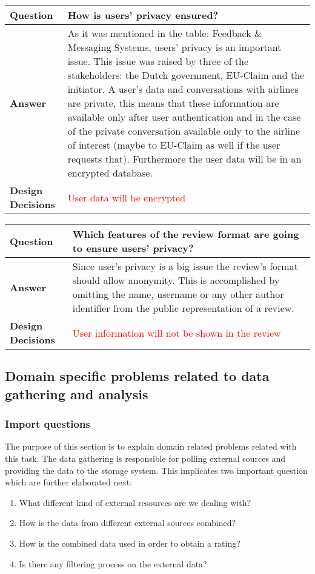 \begin{longtable}{| l |  p{12cm} |}
\hline
\textbf{Question} & \textbf{How is users' privacy ensured?} \\ \hline
\textbf{Answer} &
	As it was mentioned in the table: Feedback \& Messaging Systems, users' privacy is an important issue. This issue was raised by three of the stakeholders: the
Dutch government, EU-Claim and the initiator. A user's data and conversations with airlines are private, this means that these information are available only after user authentication 
and in the case of the private conversation available only to the airline of interest (maybe to EU-Claim as well if the user requests that). Furthermore the user data will be in an encrypted database.
 \\ \hline
\textbf{Design Decisions} & \textcolor{red}{User data will be encrypted} \\ \hline
\end{longtable}

\begin{longtable}{| l |  p{12cm} |}
\hline
\textbf{Question} & \textbf{Which features of the review format are going to ensure users' privacy?} \\ \hline
\textbf{Answer} &
	Since user's privacy is a big issue the review's format should allow anonymity. This is accomplished by omitting the name, username or any other author 
identifier from the public representation of a review.
 \\ \hline
\textbf{Design Decisions} & \textcolor{red}{User information will not be shown in the review} \\ \hline
\end{longtable}


\subsection{Domain specific problems related to data gathering and analysis}
\subsubsection{Import questions}
The purpose of this section is to explain domain related problems related with this task. The data gathering is responsible for polling external sources and providing the data to the storage system. This implicates two important question which are further elaborated next:
\begin{enumerate}
\item	What different kind of external resources are we dealing with?
\item	How is the data from different external sources combined?
\item	How is the combined data used in order to obtain a rating?
\item	Is there any filtering process on the external data?
\end{enumerate}

